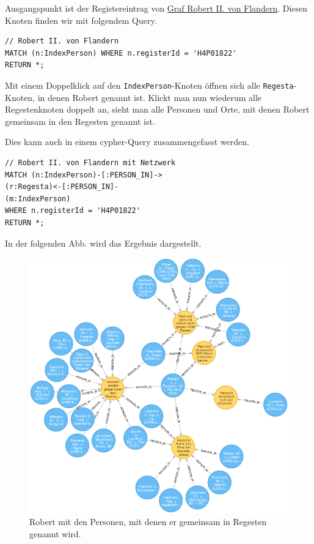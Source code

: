 \documentclass[ngerman,]{scrreprt}
\begin{document}
Ausgangspunkt ist der Registereintrag von \href{https://de.wikipedia.org/wiki/Robert_II._(Flandern)}{Graf Robert II. von Flandern}. Diesen Knoten finden wir mit folgendem Query.

\begin{verbatim}
// Robert II. von Flandern
MATCH (n:IndexPerson) WHERE n.registerId = 'H4P01822'
RETURN *;
\end{verbatim}

Mit einem Doppelklick auf den \texttt{IndexPerson}-Knoten öffnen sich alle \texttt{Regesta}-Knoten, in denen Robert genannt ist. Klickt man nun wiederum alle Regestenknoten doppelt an, sieht man alle Personen und Orte, mit denen Robert gemeinsam in den Regesten genannt ist.

Dies kann auch in einem cypher-Query zusammengefasst werden.

\begin{verbatim}
// Robert II. von Flandern mit Netzwerk
MATCH (n:IndexPerson)-[:PERSON_IN]->
(r:Regesta)<-[:PERSON_IN]-
(m:IndexPerson)
WHERE n.registerId = 'H4P01822'
RETURN *;
\end{verbatim}

In der folgenden Abb. wird das Ergebnis dargestellt.

\begin{figure}
\centering
\includegraphics{Bilder/RI2Graph/RobertVonFlandernMitRegesten.png}
\caption{Robert mit den Personen, mit denen er gemeinsam in Regesten genannt wird.}
\end{figure}
\end{document}
